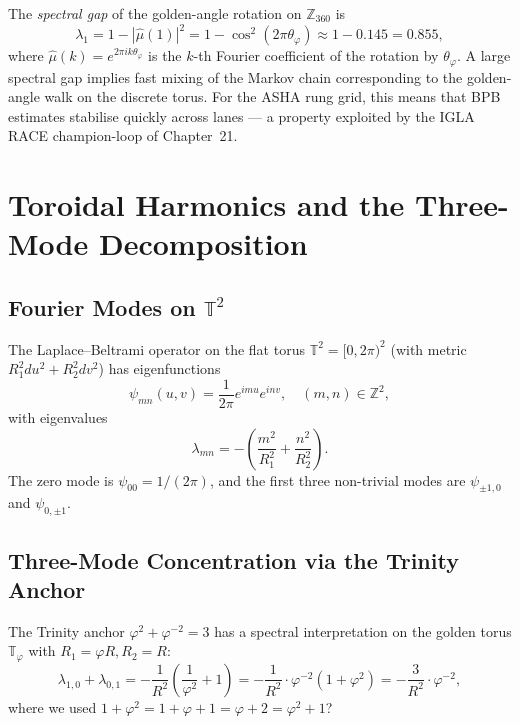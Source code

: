 The \emph{spectral gap} of the golden-angle rotation on $\mathbb{Z}_{360}$ is
\begin{equation}
  \lambda_1 = 1 - |\hat\mu(1)|^2 = 1 - \cos^2(2\pi\theta_\varphi) \approx 1 - 0.145 = 0.855,
\end{equation}
where $\hat\mu(k) = e^{2\pi ik\theta_\varphi}$ is the $k$-th Fourier coefficient
of the rotation by $\theta_\varphi$.
A large spectral gap implies fast mixing of the Markov chain corresponding to
the golden-angle walk on the discrete torus.
For the ASHA rung grid, this means that BPB estimates stabilise quickly across
lanes — a property exploited by the IGLA RACE champion-loop of Chapter~21.

\section{Toroidal Harmonics and the Three-Mode Decomposition}
\label{sec:ch18-harmonics}

\subsection{Fourier Modes on \texorpdfstring{$\mathbb{T}^2$}{T2}}\label{subsec:ch18-fourier}

The Laplace--Beltrami operator on the flat torus $\mathbb{T}^2 = [0,2\pi)^2$ (with
metric $R_1^2 du^2 + R_2^2 dv^2$) has eigenfunctions
\begin{equation}\label{eq:torus-eigenfunctions}
  \psi_{mn}(u,v) = \frac{1}{2\pi}e^{imu}e^{inv}, \quad (m,n) \in \mathbb{Z}^2,
\end{equation}
with eigenvalues
\begin{equation}\label{eq:torus-eigenvalues}
  \lambda_{mn} = -\left(\frac{m^2}{R_1^2} + \frac{n^2}{R_2^2}\right).
\end{equation}
The zero mode is $\psi_{00} = 1/(2\pi)$, and the first three non-trivial modes
are $\psi_{\pm 1,0}$ and $\psi_{0,\pm 1}$.

\subsection{Three-Mode Concentration via the Trinity Anchor}\label{subsec:ch18-trinity-mode}

The Trinity anchor $\varphi^2 + \varphi^{-2} = 3$ has a spectral interpretation
on the golden torus $\mathbb{T}_\varphi$ with $R_1 = \varphi R, R_2 = R$:
\begin{equation}\label{eq:trinity-spectral}
  \lambda_{1,0} + \lambda_{0,1} = -\frac{1}{R^2}\left(\frac{1}{\varphi^2} + 1\right)
  = -\frac{1}{R^2}\cdot\varphi^{-2}(1 + \varphi^2)
  = -\frac{3}{R^2}\cdot\varphi^{-2},
\end{equation}
where we used $1 + \varphi^2 = 1 + \varphi + 1 = \varphi + 2 = \varphi^2 + 1$?

